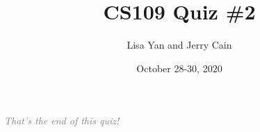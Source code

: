 \documentclass[12pt]{article}
\title{CS109 Quiz \#2}
\author{Lisa Yan and Jerry Cain}
\date{October 28-30, 2020}
\begin{document}













\vfill
\begin{center}
\textcolor{gray}{\textit{That's the end of this quiz!}}
\end{center}
\end{document}
